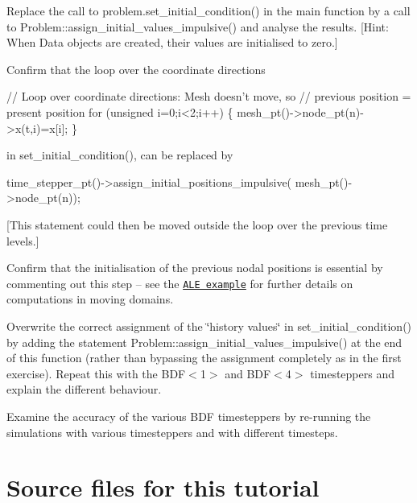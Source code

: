 \begin{DoxyEnumerate}
\item Replace the call to {\ttfamily problem.\+set\+\_\+initial\+\_\+condition()} in the main function by a call to {\ttfamily Problem\+::assign\+\_\+initial\+\_\+values\+\_\+impulsive()} and analyse the results. \mbox{[}Hint\+: When {\ttfamily Data} objects are created, their values are initialised to zero.\mbox{]}
\item Confirm that the loop over the coordinate directions  
\begin{DoxyCodeInclude}
     \textcolor{comment}{// Loop over coordinate directions: Mesh doesn't move, so }
     \textcolor{comment}{// previous position = present position}
     \textcolor{keywordflow}{for} (\textcolor{keywordtype}{unsigned} i=0;i<2;i++)
      \{
       mesh\_pt()->node\_pt(n)->x(t,i)=x[i];
      \}

\end{DoxyCodeInclude}
 in {\ttfamily set\+\_\+initial\+\_\+condition()}, can be replaced by 
\begin{DoxyCode}
time\_stepper\_pt()->assign\_initial\_positions\_impulsive(
                     mesh\_pt()->node\_pt(n));
\end{DoxyCode}
 \mbox{[}This statement could then be moved outside the loop over the previous time levels.\mbox{]}
\item Confirm that the initialisation of the previous nodal positions is essential by commenting out this step -- see the \href{../../two_d_unsteady_heat_ALE/html/index.html}{\tt A\+LE example} for further details on computations in moving domains.
\item Overwrite the correct assignment of the \char`\"{}history values\char`\"{} in {\ttfamily set\+\_\+initial\+\_\+condition()} by adding the statement {\ttfamily Problem\+::assign\+\_\+initial\+\_\+values\+\_\+impulsive()} at the end of this function (rather than bypassing the assignment completely as in the first exercise). Repeat this with the {\ttfamily B\+D\+F$<$1$>$} and {\ttfamily B\+D\+F$<$4$>$} timesteppers and explain the different behaviour.
\item Examine the accuracy of the various {\ttfamily B\+DF} timesteppers by re-\/running the simulations with various timesteppers and with different timesteps.
\end{DoxyEnumerate}



 

\hypertarget{index_sources}{}\section{Source files for this tutorial}\label{index_sources}

